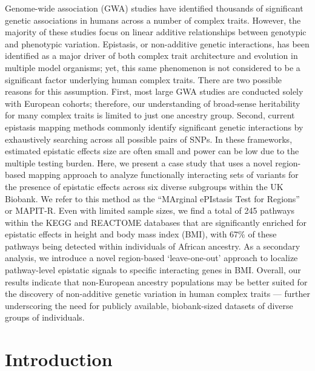 \documentclass[10pt]{article}
\begin{document}
Genome-wide association (GWA) studies have identified thousands of significant genetic associations in humans across a number of complex traits. However, the majority of these studies focus on linear additive relationships between genotypic and phenotypic variation. Epistasis, or non-additive genetic interactions, has been identified as a major driver of both complex trait architecture and evolution in multiple model organisms; yet, this same phenomenon is not considered to be a significant factor underlying human complex traits. There are two possible reasons for this assumption. First, most large GWA studies are conducted solely with European cohorts; therefore, our understanding of broad-sense heritability for many complex traits is limited to just one ancestry group. Second, current epistasis mapping methods commonly identify significant genetic interactions by exhaustively searching across all possible pairs of SNPs. In these frameworks, estimated epistatic effects size are often small and power can be low due to the multiple testing burden. Here, we present a case study that uses a novel region-based mapping approach to analyze functionally interacting sets of variants for the presence of epistatic effects across six diverse subgroups within the UK Biobank. We refer to this method as the ``MArginal ePIstasis Test for Regions'' or MAPIT-R. Even with limited sample sizes, we find a total of 245 pathways within the KEGG and REACTOME databases that are significantly enriched for epistatic effects in height and body mass index (BMI), with 67\% of these pathways being detected within individuals of African ancestry. As a secondary analysis, we introduce a novel region-based `leave-one-out' approach to localize pathway-level epistatic signals to specific interacting genes in BMI. Overall, our results indicate that non-European ancestry populations may be better suited for the discovery of non-additive genetic variation in human complex traits --- further underscoring the need for publicly available, biobank-sized datasets of diverse groups of individuals.


\section*{Introduction}\label{InterPath-Introduction}
\end{document}
